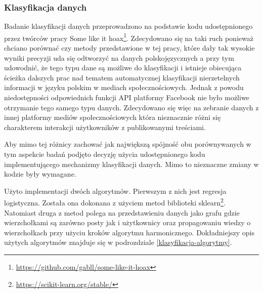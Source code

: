 \subsubsection{Klasyfikacja danych}
Badanie klasyfikacji danych przeprowadzono na podstawie kodu udostępnionego przez twórców pracy Some like it hoax\footnote{\url{https://github.com/gabll/some-like-it-hoax}}. Zdecydowano się na taki ruch ponieważ chciano porównać czy metody przedstawione w tej pracy, które dały tak wysokie wyniki precyzji uda się odtworzyć na danych polskojęzycznych a przy tym udowodnić, że tego typu dane są możliwe do klasyfikacji i istnieje obiecująca ścieżka dalszych prac nad tematem automatycznej klasyfikacji nierzetelnych informacji w języku polskim w mediach społecznościowych. Jednak z powodu niedostępności odpowiednich funkcji API platformy Facebook nie było możliwe otrzymanie tego samego typu danych. Zdecydowano się więc na zebranie danych z innej platformy mediów społecznościowych która nieznacznie różni się charakterem interakcji użytkowników z publikowanymi treściami. 
\par
Aby mimo tej różnicy zachować jak największą spójność obu porównywanych w tym aspekcie badań podjęto decyzję użycia udostępnionego kodu implementującego mechanizmy klasyfikacji danych. Mimo to nieznaczne zmiany w kodzie były wymagane.
\par
Użyto implementacji dwóch algorytmów. Pierwszym z nich jest regresja logistyczna. Została ona dokonana z użyciem metod biblioteki sklearn\footnote{\url{https://scikit-learn.org/stable/}}. Natomiast druga z metod polega na przedstawieniu danych jako grafu gdzie wierzchołkami są zarówno posty jak i użytkownicy oraz propagowaniu wiedzy o wierzchołkach przy użyciu kroków algorytmu harmonicznego. Dokładniejszy opis użytych algorytmów znajduje się w podrozdziale \ref{klasyfikacja-algorytmy}. 